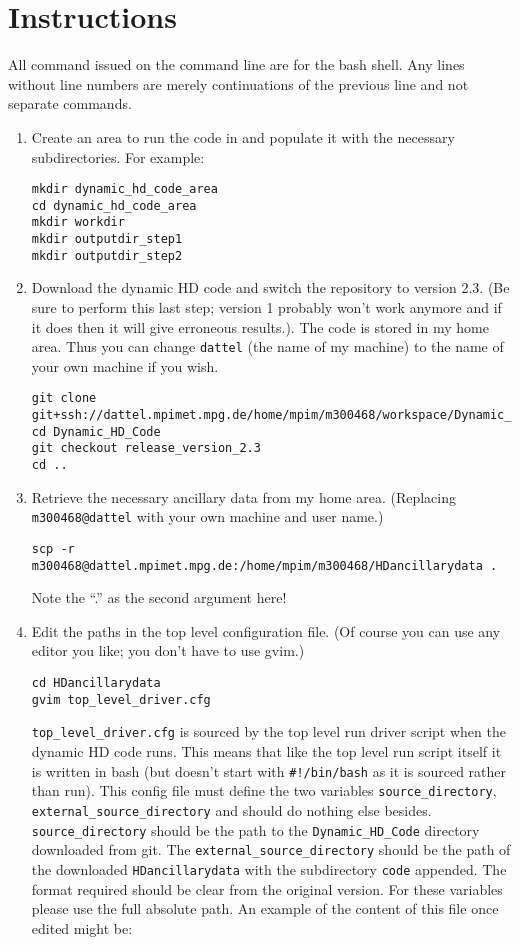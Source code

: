 \documentclass{article}
\begin{document}
\section{Instructions}
All command issued on the command line are for the bash shell. Any lines without line numbers are merely continuations of the previous line and not separate commands.
\begin{enumerate}
\item Create an area to run the code in and populate it with the necessary subdirectories. For example:
\begin{lstlisting}[style=bash_input]
mkdir dynamic_hd_code_area
cd dynamic_hd_code_area
mkdir workdir
mkdir outputdir_step1
mkdir outputdir_step2
\end{lstlisting}
\item Download the dynamic HD code and switch the repository to version 2.3. (Be sure to perform this last step; version 1 probably won't work anymore and if it does then it will give erroneous results.). The code is stored in my home area. Thus you can change  \lstinline[style=bash_input]{dattel} (the name of my machine) to the name of your own machine if you wish.
\begin{lstlisting}[style=bash_input,breaklines=true]
git clone git+ssh://dattel.mpimet.mpg.de/home/mpim/m300468/workspace/Dynamic_HD_Code
cd Dynamic_HD_Code
git checkout release_version_2.3
cd ..
\end{lstlisting}
\item Retrieve the necessary ancillary data from my home area. (Replacing \lstinline[style=bash_input]{m300468@dattel} with your own machine and user name.)
\begin{lstlisting}[style=bash_input,breaklines=true]
scp -r m300468@dattel.mpimet.mpg.de:/home/mpim/m300468/HDancillarydata .
\end{lstlisting}
Note the ``.'' as the second argument here!
\item Edit the paths in the top level configuration file. (Of course you can use any editor you like; you don't have to use gvim.)
\begin{lstlisting}[style=bash_input]
cd HDancillarydata
gvim top_level_driver.cfg
\end{lstlisting}
\lstinline[style=bash_input]{top_level_driver.cfg} is sourced by the top level run driver script when the dynamic HD code runs. This means that like the top level run script itself it is written in bash (but doesn't start with \lstinline[style=bash_input]{#!/bin/bash} as it is sourced rather than run). This config file must define the two variables \lstinline[style=bash_input]{source_directory}, \lstinline[style=bash_input]{external_source_directory} and should do nothing else besides. \lstinline[style=bash_input]{source_directory} should be the path to the \lstinline[style=bash_input]{Dynamic_HD_Code} directory downloaded from git. The \lstinline[style=bash_input]{external_source_directory} should be the path of the downloaded \lstinline[style=bash_input]{HDancillarydata} with the subdirectory \lstinline[style=bash_input]{code} appended. The format required should be clear from the original version. For these variables please use the full absolute path. An example of the content of this file once edited might be:

\end{enumerate}
\end{document}
